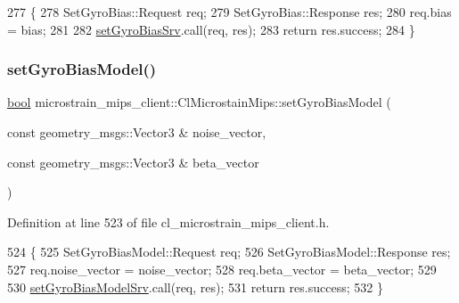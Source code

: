 \begin{DoxyCode}
277     \{
278         SetGyroBias::Request req;
279         SetGyroBias::Response res;
280         req.bias = bias;
281 
282         \hyperlink{classmicrostrain__mips__client_1_1ClMicrostainMips_a6b151b17844ab99c2cf5831149f4c572}{setGyroBiasSrv}.call(req, res);
283         \textcolor{keywordflow}{return} res.success;
284     \}
\end{DoxyCode}
\mbox{\label{classmicrostrain__mips__client_1_1ClMicrostainMips_aa19331d65cf8f5042c746985cd505a38}} 
\subsubsection{\texorpdfstring{set\+Gyro\+Bias\+Model()}{setGyroBiasModel()}}
{\footnotesize\ttfamily \hyperlink{classbool}{bool} microstrain\+\_\+mips\+\_\+client\+::\+Cl\+Microstain\+Mips\+::set\+Gyro\+Bias\+Model (\begin{DoxyParamCaption}\item[{const geometry\+\_\+msgs\+::\+Vector3 \&}]{noise\+\_\+vector,  }\item[{const geometry\+\_\+msgs\+::\+Vector3 \&}]{beta\+\_\+vector }\end{DoxyParamCaption})\hspace{0.3cm}{\ttfamily [inline]}}



Definition at line 523 of file cl\+\_\+microstrain\+\_\+mips\+\_\+client.\+h.


\begin{DoxyCode}
524     \{
525         SetGyroBiasModel::Request req;
526         SetGyroBiasModel::Response res;
527         req.noise\_vector = noise\_vector;
528         req.beta\_vector = beta\_vector;
529 
530         \hyperlink{classmicrostrain__mips__client_1_1ClMicrostainMips_a1a17a5d7fb3a071a779d2f1cd0e8a7e3}{setGyroBiasModelSrv}.call(req, res);
531         \textcolor{keywordflow}{return} res.success;
532     \}
\end{DoxyCode}
\mbox{\label{classmicrostrain__mips__client_1_1ClMicrostainMips_ae468f55c6725f7fa2fa8777cb41eaa34}} 
